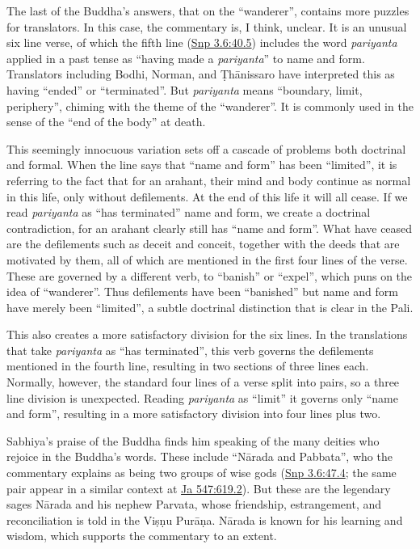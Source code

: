 \documentclass[12pt,openany]{book}%
\begin{document}
The last of the Buddha’s answers, that on the “wanderer”, contains more puzzles for translators. In this case, the commentary is, I think, unclear. It is an unusual six line verse, of which the fifth line (\href{https://suttacentral.net/snp3.6/en/sujato\#40.5}{Snp 3.6:40.5}) includes the word \textit{pariyanta} applied in a past tense as “having made a \textit{pariyanta}” to name and form. Translators including Bodhi, Norman, and \textsanskrit{Ṭhānissaro} have interpreted this as having “ended” or “terminated”. But \textit{pariyanta} means “boundary, limit, periphery”, chiming with the theme of the “wanderer”. It is commonly used in the sense of the “end of the body” at death. 

This seemingly innocuous variation sets off a cascade of problems both doctrinal and formal. When the line says that “name and form” has been “limited”, it is referring to the fact that for an arahant, their mind and body continue as normal in this life, only without defilements. At the end of this life it will all cease. If we read \textit{pariyanta} as “has terminated” name and form, we create a doctrinal contradiction, for an arahant clearly still has “name and form”. What have ceased are the defilements such as deceit and conceit, together with the deeds that are motivated by them, all of which are mentioned in the first four lines of the verse. These are governed by a different verb, to “banish” or “expel”, which puns on the idea of “wanderer”. Thus defilements have been “banished” but name and form have merely been “limited”, a subtle doctrinal distinction that is clear in the Pali.

This also creates a more satisfactory division for the six lines. In the translations that take \textit{pariyanta} as “has terminated”, this verb governs the defilements mentioned in the fourth line, resulting in two sections of three lines each. Normally, however, the standard four lines of a verse split into pairs, so a three line division is unexpected. Reading \textit{pariyanta} as “limit” it governs only “name and form”, resulting in a more satisfactory division into four lines plus two. 

Sabhiya’s praise of the Buddha finds him speaking of the many deities who rejoice in the Buddha’s words. These include “\textsanskrit{Nārada} and Pabbata”, who the commentary explains as being two groups of wise gods (\href{https://suttacentral.net/snp3.6/en/sujato\#47.4}{Snp 3.6:47.4}; the same pair appear in a similar context at \href{https://suttacentral.net/ja547}{Ja 547:619.2}). But these are the legendary sages \textsanskrit{Nārada} and his nephew Parvata, whose friendship, estrangement, and reconciliation is told in the \textsanskrit{Viṣṇu} \textsanskrit{Purāṇa}. \textsanskrit{Nārada} is known for his learning and wisdom, which supports the commentary to an extent. 
\end{document}
